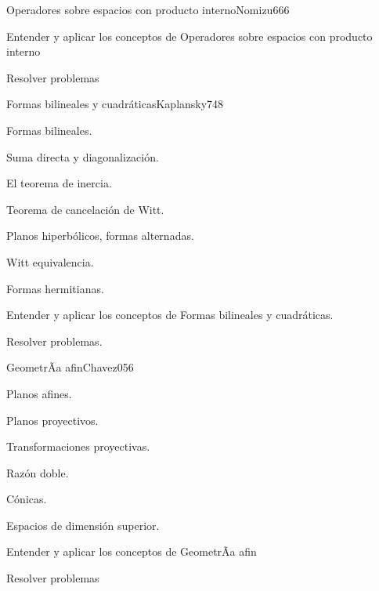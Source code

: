 \begin{syllabus}
\begin{unit}{Operadores sobre espacios con producto interno}{Nomizu66}{6}
   \begin{unitgoals}
         \item  Entender y aplicar los conceptos de Operadores sobre espacios con producto interno
         \item  Resolver problemas
   \end{unitgoals}
\end{unit}

\begin{unit}{Formas bilineales y cuadráticas}{Kaplansky74}{8}
   \begin{topics}
	\item Formas bilineales.
	\item Suma directa y diagonalización.
	\item El teorema de inercia.
	\item Teorema de cancelación de Witt.
	\item Planos hiperbólicos, formas alternadas.
	\item Witt equivalencia.
	\item Formas hermitianas.
   \end{topics}

   \begin{unitgoals}
         \item Entender y aplicar los conceptos de Formas bilineales y cuadráticas.
         \item Resolver problemas.
   \end{unitgoals}
\end{unit}

\begin{unit}{GeometrÃ­a afin}{Chavez05}{6}
   \begin{topics}
         \item  Planos afines.
	 \item  Planos proyectivos.
         \item  Transformaciones proyectivas.
	 \item  Razón doble.
         \item  Cónicas.
         \item  Espacios de dimensión superior.
   \end{topics}

   \begin{unitgoals}
         \item  Entender y aplicar los conceptos de GeometrÃ­a afin
         \item  Resolver problemas
   \end{unitgoals}
\end{unit}

\begin{coursebibliography}
\end{coursebibliography}

\end{syllabus}
